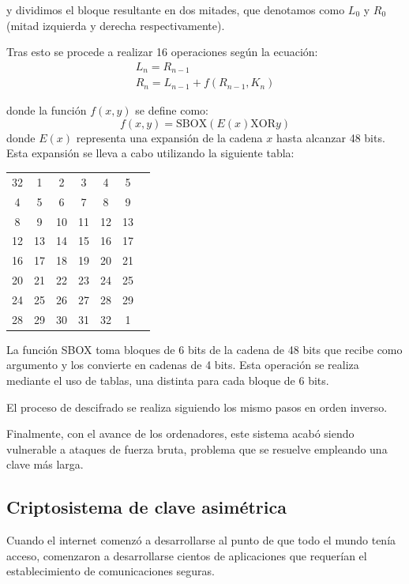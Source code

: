 \documentclass[nochap]{apuntesURJC}
\begin{document}
\begin{enumerate}
y dividimos el bloque resultante en dos mitades, que denotamos como $L_0$ y $R_0$ (mitad izquierda y derecha respectivamente).

Tras esto se procede a realizar 16 operaciones según la ecuación:
\[\begin{array}{l}
L_n = R_{n-1} \\
R_n = L_{n-1}+f(R_{n-1},K_n)
\end{array}\]

donde la función $f(x,y)$ se define como:
\[f(x,y) = \text{SBOX}(E(x) \text{XOR} y)\]
donde $E(x)$ representa una expansión de la cadena $x$ hasta alcanzar 48 bits. Esta expansión se lleva a cabo utilizando la siguiente tabla:
\begin{center}
\begin{tabular}{ccccccc}
32 &  1 &   2 &   3 &   4 &   5\\
4  & 5  &  6  &  7  &  8  &  9\\
8  & 9  & 10  & 11  & 12  & 13\\
12 & 13 &  14 &  15 &  16 &  17\\
16 & 17 &  18 &  19 &  20 &  21\\
20 & 21 &  22 &  23 &  24 &  25\\
24 & 25 &  26 &  27 &  28 &  29\\
28 & 29 &  30 &  31 &  32 &   1
\end{tabular}
\end{center}

La función SBOX toma bloques de 6 bits de la cadena de 48 bits que recibe como argumento y los convierte en cadenas de 4 bits. Esta operación se realiza mediante el uso de tablas, una distinta para cada bloque de 6 bits.


\end{enumerate}

El proceso de descifrado se realiza siguiendo los mismo pasos en orden inverso.

Finalmente, con el avance de los ordenadores, este sistema acabó siendo vulnerable a ataques de fuerza bruta, problema que se resuelve empleando una clave más larga.

\subsection{Criptosistema de clave asimétrica}
Cuando el internet comenzó a desarrollarse al punto de que todo el mundo tenía acceso, comenzaron a desarrollarse cientos de aplicaciones que requerían el establecimiento de comunicaciones seguras.
\end{document}
